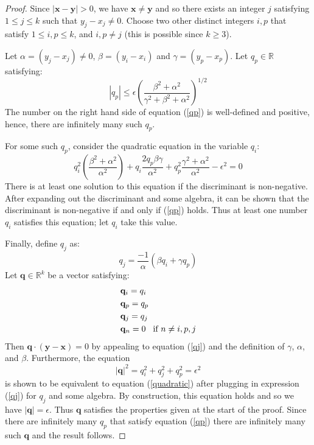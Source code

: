 \documentclass[12pt]{article}
\begin{document}
\begin{proof}
Since $|\mathbf{x} - \mathbf{y} | > 0$, we have $\mathbf{x} \neq \mathbf{y}$ and so there exists an integer $j$ satisfying $1\leq j \leq k$ such that $y_j - x_j \neq 0$.  Choose two other distinct integers $i, p$ that satisfy $1 \leq i,p \leq k$, and $i,p \neq j$ (this is possible since $k\geq 3$).\par
Let $\alpha = (y_j - x_j) \neq 0$, $\beta = (y_i - x_i)$ and $\gamma = (y_p - x_p)$.  Let $q_p\in \mathbb{R}$ satisfying:
\begin{equation}\label{qp}
|q_p| \leq \epsilon \left( \frac{\beta^2 + \alpha^2}{\gamma^2 + \beta^2 + \alpha^2}\right)^{1/2}
\end{equation}
The number on the right hand side of equation (\ref{qp}) is well-defined and positive, hence, there are infinitely many such $q_p$.\par
For some such $q_p$, consider the quadratic equation in the variable $q_i$:
\begin{equation}\label{quadratic}
q_i^2\left(\frac{\beta^2 + \alpha^2}{\alpha^2}\right) + q_i\frac{2q_p\beta\gamma}{\alpha^2} + q_p^2\frac{\gamma^2 + \alpha^2}{\alpha^2} - \epsilon^2 = 0
\end{equation}
There is at least one solution to this equation if the discriminant is non-negative.  After expanding out the discriminant and some algebra, it can be shown that the discriminant is non-negative if and only if (\ref{qp}) holds.  Thus at least one number $q_i$ satisfies this equation; let $q_i$ take this value. \par
Finally, define $q_j$ as:
\begin{equation}\label{qj}
 q_j = \frac{-1}{\alpha}(\beta q_i + \gamma q_p)  
 \end{equation}
 Let $\mathbf{q} \in \mathbb{R}^k$ be a vector satisfying:
\begin{align}
&\mathbf{q}_i = q_i \\
&\mathbf{q}_p = q_p \\
&\mathbf{q}_j = q_j \\
&\mathbf{q}_n = 0 \hspace{3mm} \text{if} \ n\neq i,p,j
\end{align}
Then $\mathbf{q} \cdot (\mathbf{y} - \mathbf{x}) = 0$ by appealing to equation (\ref{qj}) and the definition of $\gamma$, $\alpha$, and $\beta$.  Furthermore, the equation
\begin{equation}
|\mathbf{q}|^2 = q_i^2 + q_j^2 + q_p^2 = \epsilon^2
\end{equation}
is shown to be equivalent to equation (\ref{quadratic}) after plugging in expression (\ref{qj}) for $q_j$ and some algebra.  By construction, this equation holds and so we have $|\mathbf{q}| = \epsilon$.  Thus $\mathbf{q}$ satisfies the properties given at the start of the proof.  Since there are infinitely many $q_p$ that satisfy equation (\ref{qp}) there are infinitely many such $\mathbf{q}$ and the result follows.


\end{proof}
\end{document}
